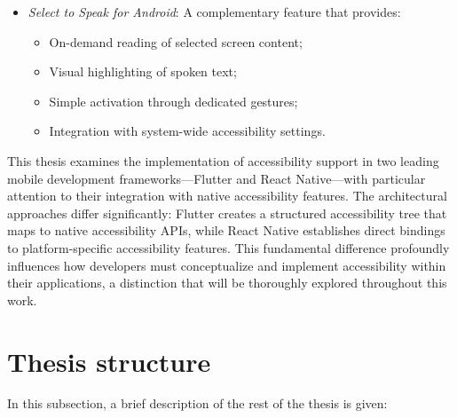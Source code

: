 \begin{itemize}
    \item \textit{Select to Speak for Android}: A complementary feature that provides:
        \begin{itemize}
            \item On-demand reading of selected screen content;
            \item Visual highlighting of spoken text;
            \item Simple activation through dedicated gestures;
            \item Integration with system-wide accessibility settings.
        \end{itemize}
\end{itemize}

This thesis examines the implementation of accessibility support in two leading mobile development frameworks—Flutter and React Native—with particular attention to their integration with native accessibility features. The architectural approaches differ significantly: Flutter creates a structured accessibility tree that maps to native accessibility APIs, while React Native establishes direct bindings to platform-specific accessibility features. This fundamental difference profoundly influences how developers must conceptualize and implement accessibility within their applications, a distinction that will be thoroughly explored throughout this work.

\section{Thesis structure}
\label{chap:intro-structure} 

In this subsection, a brief description of the rest of the thesis is given:

